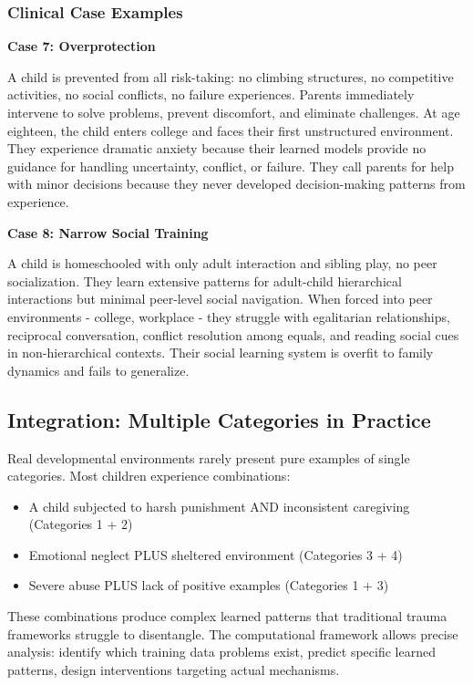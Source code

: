 \documentclass{article}
\begin{document}
\subsubsection{Clinical Case Examples}

\textbf{Case 7: Overprotection}

A child is prevented from all risk-taking: no climbing structures, no competitive activities, no social conflicts, no failure experiences. Parents immediately intervene to solve problems, prevent discomfort, and eliminate challenges. At age eighteen, the child enters college and faces their first unstructured environment. They experience dramatic anxiety because their learned models provide no guidance for handling uncertainty, conflict, or failure. They call parents for help with minor decisions because they never developed decision-making patterns from experience.

\textbf{Case 8: Narrow Social Training}

A child is homeschooled with only adult interaction and sibling play, no peer socialization. They learn extensive patterns for adult-child hierarchical interactions but minimal peer-level social navigation. When forced into peer environments - college, workplace - they struggle with egalitarian relationships, reciprocal conversation, conflict resolution among equals, and reading social cues in non-hierarchical contexts. Their social learning system is overfit to family dynamics and fails to generalize.

\subsection{Integration: Multiple Categories in Practice}

Real developmental environments rarely present pure examples of single categories. Most children experience combinations:

\begin{itemize}
\item A child subjected to harsh punishment AND inconsistent caregiving (Categories 1 + 2)
\item Emotional neglect PLUS sheltered environment (Categories 3 + 4)
\item Severe abuse PLUS lack of positive examples (Categories 1 + 3)
\end{itemize}

These combinations produce complex learned patterns that traditional trauma frameworks struggle to disentangle. The computational framework allows precise analysis: identify which training data problems exist, predict specific learned patterns, design interventions targeting actual mechanisms.
\end{document}
